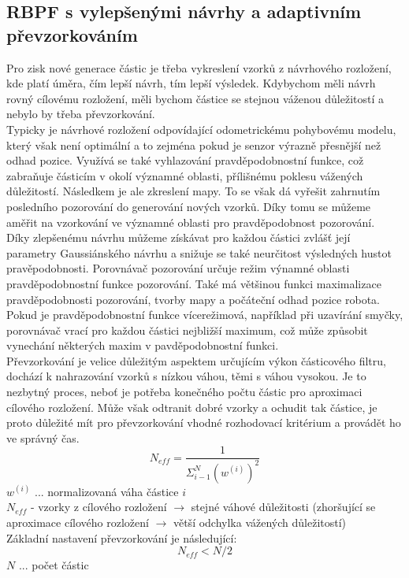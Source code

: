 \documentclass[11pt]{article}
\begin{document}
\subsection{RBPF s vylepšenými návrhy a adaptivním převzorkováním}
Pro zisk nové generace částic je třeba vykreslení vzorků z návrhového rozložení, kde platí úměra, čím lepší návrh, tím lepší výsledek. Kdybychom měli návrh rovný cílovému rozložení, měli bychom částice se stejnou váženou důležitostí a nebylo by třeba převzorkování. \\
\indent Typicky je návrhové rozložení odpovídající odometrickému pohybovému modelu, který však není optimální a to zejména pokud je senzor výrazně přesnější než odhad pozice. Využívá se také vyhlazování pravděpodobnostní funkce, což zabraňuje částicím v okolí významné oblasti, přílišnému poklesu vážených důležitostí. Následkem je ale zkreslení mapy. To se však dá vyřešit zahrnutím posledního pozorování do generování nových vzorků. Díky tomu se můžeme aměřit na vzorkování ve významné oblasti pro pravděpodobnost pozorování.\\
\indent Díky zlepšenému návrhu můžeme získávat pro každou částici zvlášť její parametry Gaussiánského návrhu a snižuje se také neurčitost výsledných hustot pravěpodobnosti. Porovnávač pozorování určuje režim výnamné oblasti pravděpodobnostní funkce pozorování. Také má většinou funkci maximalizace pravděpodobnosti pozorování, tvorby mapy a počáteční odhad pozice robota. Pokud je pravděpodobnostní funkce vícerežimová, například při uzavírání smyčky, porovnávač vrací pro každou částici nejbližší maximum, což může způsobit vynechání některých maxim v pavděpodobnostní funkci.\\
\indent Převzorkování je velice důležitým aspektem určujícím výkon částicového filtru, dochází k nahrazování vzorků s nízkou váhou, těmi s váhou vysokou. Je to nezbytný proces, neboť je potřeba konečného počtu částic pro aproximaci cílového rozložení. Může však odtranit dobré vzorky a ochudit tak částice, je proto důležité mít pro převzorkování vhodné rozhodovací kritérium a provádět ho ve správný čas. 
$$N_{eff}=\frac{1}{\varSigma_{i-1}^N(w^{(i)})^2}$$ 
$w^{(i)}$ ... normalizovaná váha částice $i$ \\
$N_{eff}$ - vzorky z cílového rozložení $\rightarrow$ stejné váhové důležitosti (zhoršující se aproximace cílového rozložení $\rightarrow$ větší odchylka vážených důležitostí)\\
Základní nastavení převzorkování je následující:
$$N_{eff} < N/2$$
$N$ ... počet částic\\
\end{document}
